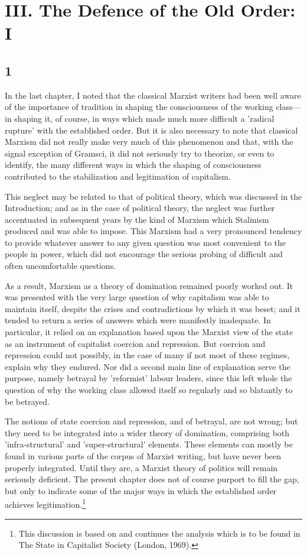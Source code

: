 \chapter*{III. The Defence of the Old Order: I}


\section*{1}
In the last chapter, I noted that the classical Marxist writers had been well aware of the importance of tradition in shaping the consciousness of the working class—in shaping it, of course, in ways which made much more difficult a 'radical rupture' with the established order. But it is also necessary to note that classical Marxism did not really make very much of this phenomenon and that, with the signal exception of Gramsci, it did not seriously try to theorize, or even to identify, the many different ways in which the shaping of consciousness contributed to the stabilization and legitimation of capitalism.

This neglect may be related to that of political theory, which was discussed in the Introduction; and as in the case of political theory, the neglect was further accentuated in subsequent years by the kind of Marxism which Stalinism produced and was able to impose. This Marxism had a very pronounced tendency to provide whatever answer to any given question was most convenient to the people in power, which did not encourage the serious probing of difficult and often uncomfortable questions.

As a result, Marxism as a theory of domination remained poorly worked out. It was presented with the very large question of why capitalism was able to maintain itself, despite the crises and contradictions by which it was beset; and it tended to return a series of answers which were manifestly inadequate. In particular, it relied on an explanation based upon the Marxist view of the state as an instrument of capitalist coercion and repression. But coercion and repression could not possibly, in the case of many if not most of these regimes, explain why they endured. Nor did a second main line of explanation serve the purpose, namely betrayal by 'reformist' labour leaders, since this left whole the question of why the working class allowed itself so regularly and so blatantly to be betrayed.

The notions of state coercion and repression, and of betrayal, are not wrong; but they need to be integrated into a wider theory of domination, comprising both 'infra-structural' and 'super\hyp{}structural' elements. These elements can mostly be found in various parts of the corpus of Marxist writing, but have never been properly integrated. Until they are, a Marxist theory of politics will remain seriously deficient. The present chapter does not of course purport to fill the gap, but only to indicate some of the major ways in which the established order achieves legitimation.\footnote{This discussion is based on and continues the analysis which is to be found in The State in Capitalist Society (London, 1969).}

